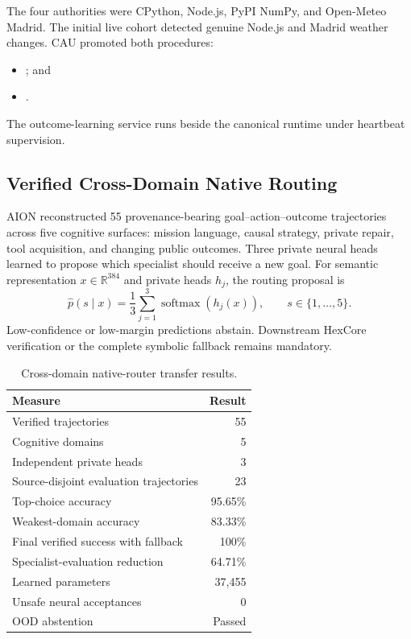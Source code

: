 The four authorities were CPython, Node.js, PyPI NumPy, and Open-Meteo Madrid.
The initial live cohort detected genuine Node.js and Madrid weather changes.
CAU promoted both procedures:
\begin{itemize}
    \item {}; and
    \item {}.
\end{itemize}
The outcome-learning service runs beside the canonical runtime under heartbeat
supervision.

\subsection{Verified Cross-Domain Native Routing}
\label{subsec:aion-native-cognitive-router}

AION reconstructed 55 provenance-bearing goal--action--outcome trajectories
across five cognitive surfaces: mission language, causal strategy, private
repair, tool acquisition, and changing public outcomes.  Three private neural
heads learned to propose which specialist should receive a new goal.  For
semantic representation $x\in\mathbb{R}^{384}$ and private heads $h_j$, the
routing proposal is
\begin{equation}
\hat{p}(s\mid x)=\frac{1}{3}\sum_{j=1}^{3}
\operatorname{softmax}\!\left(h_j(x)\right),
\qquad s\in\{1,\ldots,5\}.
\label{eq:native-router-ensemble}
\end{equation}
Low-confidence or low-margin predictions abstain.  Downstream HexCore
verification or the complete symbolic fallback remains mandatory.

\begin{table}[htbp]
\centering
\caption{Cross-domain native-router transfer results.}
\label{tab:aion-native-router}
\begin{tabular}{@{}lr@{}}
\toprule
Measure & Result \\
\midrule
Verified trajectories & 55 \\
Cognitive domains & 5 \\
Independent private heads & 3 \\
Source-disjoint evaluation trajectories & 23 \\
Top-choice accuracy & 95.65\% \\
Weakest-domain accuracy & 83.33\% \\
Final verified success with fallback & 100\% \\
Specialist-evaluation reduction & 64.71\% \\
Learned parameters & 37,455 \\
Unsafe neural acceptances & 0 \\
OOD abstention & Passed \\
\bottomrule
\end{tabular}
\end{table}

